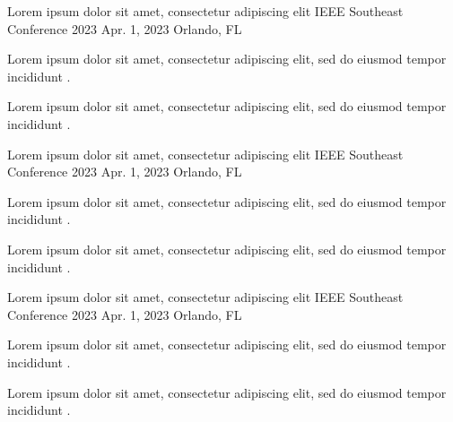 
\begin{cventries}

  \cventry
    {Lorem ipsum dolor sit amet, consectetur adipiscing elit} %
    {IEEE Southeast Conference 2023} %
    {Apr. 1, 2023} %
    {Orlando, FL} %
    {
      \begin{cvitems} %
        \item {Lorem ipsum dolor sit amet, consectetur adipiscing elit, sed do eiusmod tempor incididunt .}
        \item {Lorem ipsum dolor sit amet, consectetur adipiscing elit, sed do eiusmod tempor incididunt .}
      \end{cvitems}
    }

  \cventry
  {Lorem ipsum dolor sit amet, consectetur adipiscing elit} %
  {IEEE Southeast Conference 2023} %
  {Apr. 1, 2023} %
  {Orlando, FL} %
  {
    \begin{cvitems} %
      \item {Lorem ipsum dolor sit amet, consectetur adipiscing elit, sed do eiusmod tempor incididunt .}
      \item {Lorem ipsum dolor sit amet, consectetur adipiscing elit, sed do eiusmod tempor incididunt .}
    \end{cvitems}
  }

  \cventry
  {Lorem ipsum dolor sit amet, consectetur adipiscing elit} %
  {IEEE Southeast Conference 2023} %
  {Apr. 1, 2023} %
  {Orlando, FL} %
  {
    \begin{cvitems} %
      \item {Lorem ipsum dolor sit amet, consectetur adipiscing elit, sed do eiusmod tempor incididunt .}
      \item {Lorem ipsum dolor sit amet, consectetur adipiscing elit, sed do eiusmod tempor incididunt .}
    \end{cvitems}
  }

\end{cventries}
